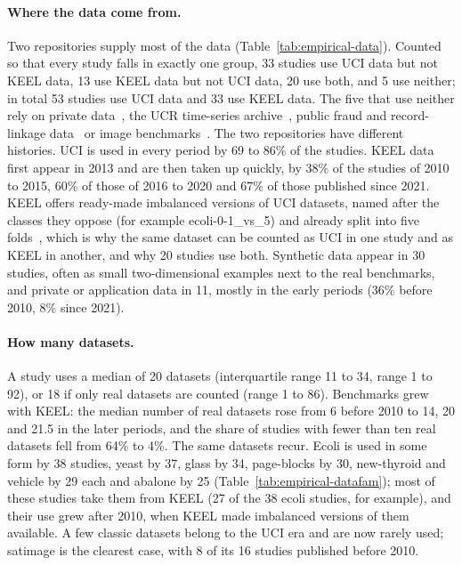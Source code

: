 \paragraph{Where the data come from.} Two repositories supply most of the data (Table~\ref{tab:empirical-data}). Counted so that every study falls in exactly one group, 33 studies use UCI data but not KEEL data, 13 use KEEL data but not UCI data, 20 use both, and 5 use neither; in total 53 studies use UCI data and 33 use KEEL data. The five that use neither rely on private data~\parencite{kubat1998shrink,cieslak2006cluster}, the UCR time-series archive~\parencite{cao2013inos}, public fraud and record-linkage data~\parencite{liu2020spe} or image benchmarks~\parencite{buda2018systematic}. The two repositories have different histories. UCI is used in every period by 69 to 86\% of the studies. KEEL data first appear in 2013 and are then taken up quickly, by 38\% of the studies of 2010 to 2015, 60\% of those of 2016 to 2020 and 67\% of those published since 2021. KEEL offers ready-made imbalanced versions of UCI datasets, named after the classes they oppose (for example ecoli-0-1\_vs\_5) and already split into five folds~\parencite{alcalafdez2011keel}, which is why the same dataset can be counted as UCI in one study and as KEEL in another, and why 20 studies use both. Synthetic data appear in 30 studies, often as small two-dimensional examples next to the real benchmarks, and private or application data in 11, mostly in the early periods (36\% before 2010, 8\% since 2021).



\paragraph{How many datasets.} A study uses a median of 20 datasets (interquartile range 11 to 34, range 1 to 92), or 18 if only real datasets are counted (range 1 to 86). Benchmarks grew with KEEL: the median number of real datasets rose from 6 before 2010 to 14, 20 and 21.5 in the later periods, and the share of studies with fewer than ten real datasets fell from 64\% to 4\%. The same datasets recur. Ecoli is used in some form by 38 studies, yeast by 37, glass by 34, page-blocks by 30, new-thyroid and vehicle by 29 each and abalone by 25 (Table~\ref{tab:empirical-datafam}); most of these studies take them from KEEL (27 of the 38 ecoli studies, for example), and their use grew after 2010, when KEEL made imbalanced versions of them available. A few classic datasets belong to the UCI era and are now rarely used; satimage is the clearest case, with 8 of its 16 studies published before 2010.

